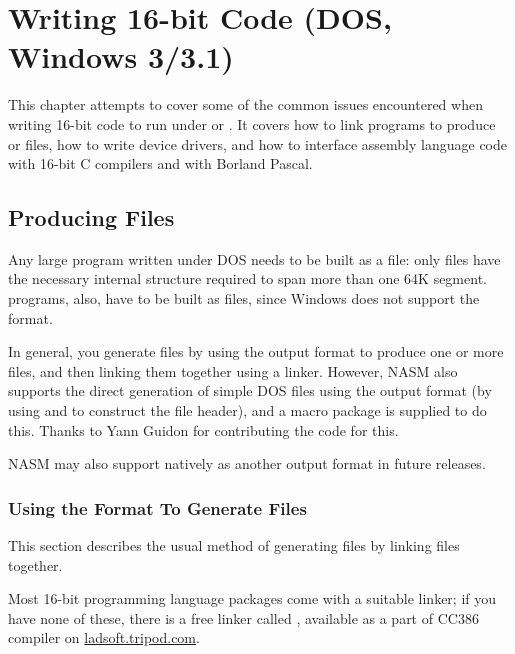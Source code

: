 \chapter{Writing 16-bit Code (DOS, Windows 3/3.1)}
\label{ch:16bit}

This chapter attempts to cover some of the common issues encountered
when writing 16-bit code to run under  or .
It covers how to link programs to produce  or  files,
how to write  device drivers, and how to interface assembly
language code with 16-bit C compilers and with Borland Pascal.

\section{Producing  Files}
\label{sec:exefiles}

Any large program written under DOS needs to be built as a 
file: only  files have the necessary internal structure
required to span more than one 64K segment.  programs,
also, have to be built as  files, since Windows does not
support the  format.

In general, you generate  files by using the  output
format to produce one or more  files, and then linking
them together using a linker. However, NASM also supports the direct
generation of simple DOS  files using the  output
format (by using  and  to construct the  file
header), and a macro package is supplied to do this. Thanks to
Yann Guidon for contributing the code for this.

NASM may also support  natively as another output format in
future releases.

\subsection{Using the  Format To Generate  Files}
\label{subsec:objexe}

This section describes the usual method of generating  files
by linking  files together.

Most 16-bit programming language packages come with a suitable
linker; if you have none of these, there is a free linker called
, available as a part of
CC386 compiler on
\href{http://ladsoft.tripod.com/cc386\_compiler.html}{ladsoft.tripod.com}.

